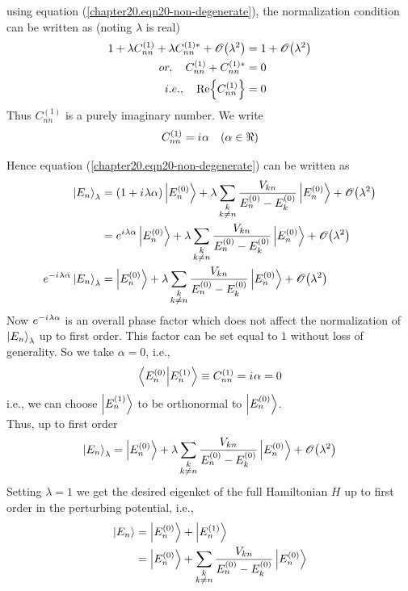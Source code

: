	using equation (\ref{chapter20.eqn20-non-degenerate}), the normalization condition can be written as (noting $\lambda$ is real)
	\begin{align}
		1 + \lambda C^{(1)}_{n n} + \lambda C^{(1)*}_{n n} + \order{\lambda^2}
		&= 1 + \order{\lambda^2} \\
		or, \quad C^{(1)}_{n n} +  C^{(1)*}_{n n} &= 0  \\
	i.e., \quad		\Re{C^{(1)}_{n n}} &= 0
	\end{align}
	Thus $C^{(1)}_{n n}$ is a purely imaginary number. We write
	\begin{equation}
		C^{(1)}_{n n} = \iu \alpha \quad (\alpha \in \real)
	\end{equation}

	Hence equation (\ref{chapter20.eqn20-non-degenerate}) can be written as
	\begin{align}
		\ket{E_n}_{\lambda} 
		&= \qty(1 + \iu \lambda \alpha) \ket{E_n^{(0)}} + \lambda \sum_{\substack{k \\ k \neq n}} \frac{V_{k n}}{E_n^{(0)} -  E_{k}^{(0)}} \ket{E_n^{(0)}} + \order{\lambda^2} \\
		&= e^{\iu \lambda \alpha} \ket{E_n^{(0)}} + \lambda \sum_{\substack{k \\ k \neq n}} \frac{V_{k n}}{E_n^{(0)} -  E_{k}^{(0)}} \ket{E_n^{(0)}} + \order{\lambda^2} \\
		e^{-\iu \lambda \alpha} \ket{E_n}_{\lambda}  &= \ket{E_n^{(0)}} + \lambda \sum_{\substack{k \\ k \neq n}} \frac{V_{k n}}{E_n^{(0)} -  E_{k}^{(0)}} \ket{E_n^{(0)}} + \order{\lambda^2}
	\end{align}
	Now $e^{-{i\mkern1mu} \lambda \alpha}$ is an overall phase factor which does not affect the normalization of $\ket{E_n}_\lambda$ up to first order. This factor can be set equal to $1$ without loss of generality. So we take $\alpha = 0$, i.e.,
	\begin{equation}
		\braket{E^{(0)}_n}{E^{(1)}_n} \equiv C^{(1)}_{n n} = {i\mkern1mu} \alpha = 0
	\end{equation}
	i.e., we can choose $\ket{E_n^{(1)}}$ to be orthonormal to $\ket{E_n^{(0)}}$.\\
	
	Thus, up to first order
	\begin{equation}
		\ket{E_n}_{\lambda}  = \ket{E_n^{(0)}} + \lambda \sum_{\substack{k \\ k \neq n}} \frac{V_{k n}}{E_n^{(0)} -  E_{k}^{(0)}} \ket{E_n^{(0)}} + \order{\lambda^2}
	\end{equation}
	Setting $\lambda = 1$ we get the desired eigenket of  the full Hamiltonian $H$ up to first order in the perturbing potential, i.e.,
	\begin{align}
		\ket{E_n}  
		&= \ket{E_n^{(0)}} + \ket{E_n^{(1)}} \\
		&= \ket{E_n^{(0)}} +  \sum_{\substack{k \\ k \neq n}} \frac{V_{k n}}{E_n^{(0)} -  E_{k}^{(0)}} \ket{E_n^{(0)}}
		\label{chapter20.eqn21-non-degenerate}
	\end{align}
	
